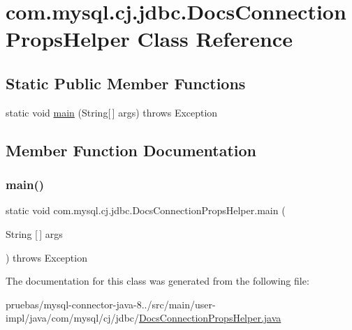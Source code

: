\hypertarget{classcom_1_1mysql_1_1cj_1_1jdbc_1_1_docs_connection_props_helper}{}\section{com.\+mysql.\+cj.\+jdbc.\+Docs\+Connection\+Props\+Helper Class Reference}
\label{classcom_1_1mysql_1_1cj_1_1jdbc_1_1_docs_connection_props_helper}
\subsection*{Static Public Member Functions}
\begin{DoxyCompactItemize}
\item 
static void \mbox{\hyperlink{classcom_1_1mysql_1_1cj_1_1jdbc_1_1_docs_connection_props_helper_aae494d4fcd9ba04815a827a11b39a805}{main}} (String\mbox{[}$\,$\mbox{]} args)  throws Exception 
\end{DoxyCompactItemize}


\subsection{Member Function Documentation}
\mbox{\label{classcom_1_1mysql_1_1cj_1_1jdbc_1_1_docs_connection_props_helper_aae494d4fcd9ba04815a827a11b39a805}} 
\subsubsection{\texorpdfstring{main()}{main()}}
{\footnotesize\ttfamily static void com.\+mysql.\+cj.\+jdbc.\+Docs\+Connection\+Props\+Helper.\+main (\begin{DoxyParamCaption}\item[{String \mbox{[}$\,$\mbox{]}}]{args }\end{DoxyParamCaption}) throws Exception\hspace{0.3cm}{\ttfamily [static]}}



The documentation for this class was generated from the following file\+:\begin{DoxyCompactItemize}
\item 
pruebas/mysql-\/connector-\/java-\/8../src/main/user-\/impl/java/com/mysql/cj/jdbc/\mbox{\hyperlink{_docs_connection_props_helper_8java}{Docs\+Connection\+Props\+Helper.\+java}}\end{DoxyCompactItemize}
